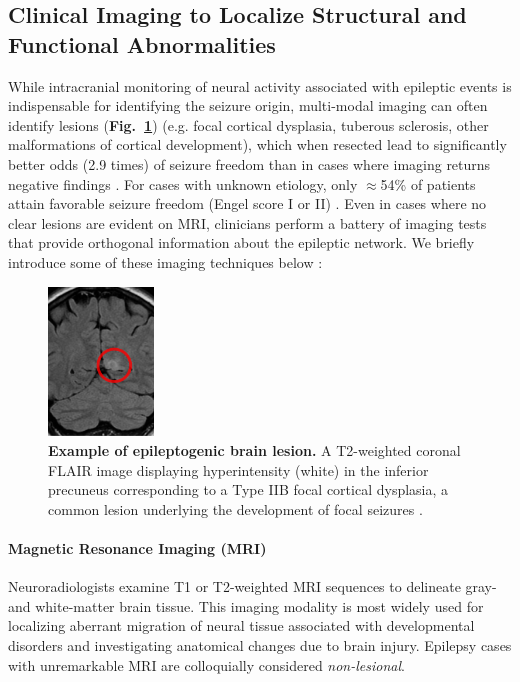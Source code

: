 \subsection{Clinical Imaging to Localize Structural and Functional Abnormalities}
While intracranial monitoring of neural activity associated with epileptic events is indispensable for identifying the seizure origin, multi-modal imaging can often identify lesions (\textbf{Fig.~\ref{typeIIfcd}}) (e.g. focal cortical dysplasia, tuberous sclerosis, other malformations of cortical development), which when resected lead to significantly better odds (2.9 times) of seizure freedom than in cases where imaging returns negative findings \cite{tellez-zenteno2010surgical}. For cases with unknown etiology, only $\approx$54\% of patients attain favorable seizure freedom (Engel score I or II) \cite{lee2005surgical}. Even in cases where no clear lesions are evident on MRI, clinicians perform a battery of imaging tests that provide orthogonal information about the epileptic network. We briefly introduce some of these imaging techniques below \cite{kuzniecky2002neuroimaging}:

\begin{figure}[H]
\centering
\includegraphics[width=0.25\textwidth]{typeIIfcd_mri}
\caption[Example of brain lesion]{\textbf{Example of epileptogenic brain lesion.} A T2-weighted coronal FLAIR image displaying hyperintensity (white) in the inferior precuneus corresponding to a Type IIB focal cortical dysplasia, a common lesion underlying the development of focal seizures \cite{gaillard2015focal}.}
\label{typeIIfcd}
\end{figure}

\paragraph{Magnetic Resonance Imaging (MRI)}
Neuroradiologists examine T1 or T2-weighted MRI sequences to delineate gray- and white-matter brain tissue. This imaging modality is most widely used for localizing aberrant migration of neural tissue associated with developmental disorders and investigating anatomical changes due to brain injury. Epilepsy cases with unremarkable MRI are colloquially considered \textit{non-lesional}.

